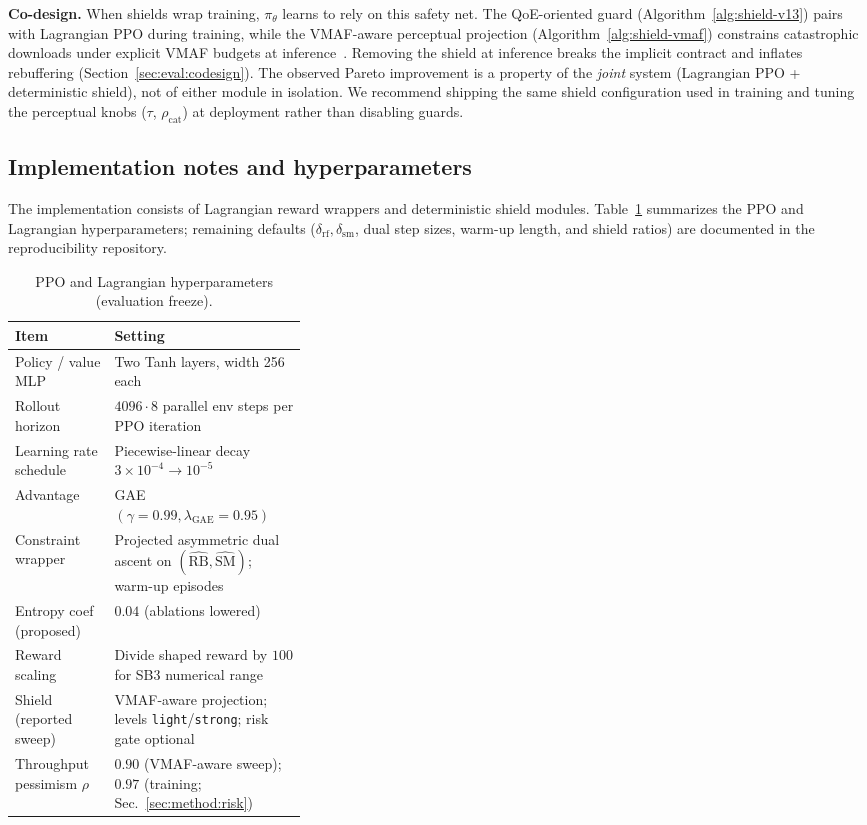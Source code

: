 \documentclass[preprint,12pt,times]{elsarticle}
\newcommand{\tablebodyfont}{\small}
\newcommand{\evaltable}[1]{%
  \begingroup\tablebodyfont
  \renewcommand{\arraystretch}{1.12}%
  \setlength{\tabcolsep}{4pt}%
  #1%
  \endgroup
}
\begin{document}
\textbf{Co-design.} When shields wrap training, \(\pi_\theta\) learns to rely on this safety net.
The QoE-oriented guard (Algorithm~\ref{alg:shield-v13}) pairs with Lagrangian PPO during training, while the VMAF-aware perceptual projection (Algorithm~\ref{alg:shield-vmaf}) constrains catastrophic downloads under explicit VMAF budgets at inference~\cite{li2016vmaf}.
Removing the shield at inference breaks the implicit contract and inflates rebuffering (Section~\ref{sec:eval:codesign}).
The observed Pareto improvement is a property of the \emph{joint} system (Lagrangian PPO + deterministic shield), not of either module in isolation.
We recommend shipping the same shield configuration used in training and tuning the perceptual knobs (\(\tau\), \(\rho_{\mathrm{cat}}\)) at deployment rather than disabling guards.

\subsection{Implementation notes and hyperparameters}

The implementation consists of Lagrangian reward wrappers and deterministic shield modules.
Table~\ref{tab:hypers} summarizes the PPO and Lagrangian hyperparameters; remaining defaults (\(\delta_{\mathrm{rf}},\delta_{\mathrm{sm}}\), dual step sizes, warm-up length, and shield ratios) are documented in the reproducibility repository.

\begin{table}[H]
    \caption{PPO and Lagrangian hyperparameters (evaluation freeze).}
    \label{tab:hypers}
    \centering
    \evaltable{%
    \renewcommand{\arraystretch}{1.15}%
    \begin{tabularx}{\linewidth}{@{}>{\raggedright\arraybackslash}p{0.34\linewidth} >{\raggedright\arraybackslash}X@{}}
    \toprule
    \textbf{Item} & \textbf{Setting} \\ \midrule
    Policy / value MLP & Two Tanh layers, width 256 each~\cite{schulman2017proximal}\\
    Rollout horizon & \(4096\cdot 8\) parallel env steps per PPO iteration\\
    Learning rate schedule & Piecewise-linear decay \(3{\times}10^{-4}{\rightarrow}10^{-5}\)\\
    Advantage & GAE \((\gamma{=}0.99,\lambda_{\mathrm{GAE}}{=}0.95)\) \\
    Constraint wrapper & Projected asymmetric dual ascent on \((\hat{\mathrm{RB}},\hat{\mathrm{SM}})\); warm-up episodes \\
    Entropy coef (proposed) & \(0.04\) (ablations lowered)\\
    Reward scaling & Divide shaped reward by \(100\) for SB3 numerical range\\
    Shield (reported sweep) & VMAF-aware projection; levels \texttt{light}/\texttt{strong}; risk gate optional\\
    Throughput pessimism \(\rho\) & \(0.90\) (VMAF-aware sweep); \(0.97\) (training; Sec.~\ref{sec:method:risk})\\\bottomrule
    \end{tabularx}%
    }
\end{table}
\end{document}
